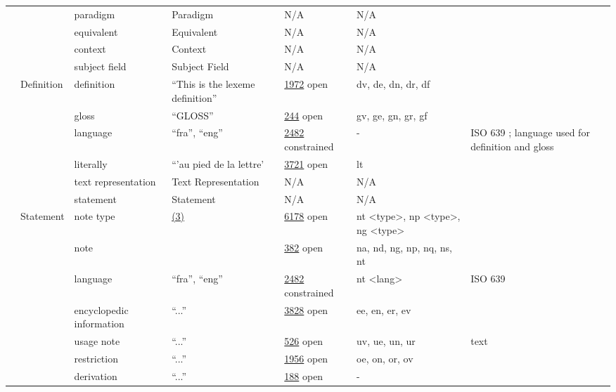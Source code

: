 \documentclass[a4paper,12pt]{article}
\begin{document}
\begin{center}
\begin{longtable}{*7{p{2cm}}}
& & paradigm & Paradigm & N/A & N/A & \\ \cmidrule{3-7}
& & equivalent & Equivalent & N/A & N/A & \\ \cmidrule{3-7}
& & context & Context & N/A & N/A & \\ \cmidrule{3-7}
& & subject field & Subject Field & N/A & N/A & \\ \cmidrule{2-7}
& \multirow{6}{2cm}{Definition} & definition & ``This is the lexeme definition'' & \href{http://www.isocat.org/datcat/DC-1972}{1972} open & dv, de, dn, dr, df & \\ \cmidrule{3-7}
& & gloss & ``\scshape{GLOSS}'' & \href{http://www.isocat.org/datcat/DC-244}{244} open & gv, ge, gn, gr, gf & \\ \cmidrule{3-7}
& & language & ``fra'', ``eng'' & \href{http://www.isocat.org/datcat/DC-2482}{2482} constrained & - & ISO 639 ; language used for definition and gloss \\ \cmidrule{3-7}
& & literally & ``'au pied de la lettre' & \href{http://www.isocat.org/datcat/DC-3721}{3721} open & lt & \\ \cmidrule{3-7}
& & text representation & Text Re\-pre\-sen\-ta\-tion & N/A & N/A & \\ \cmidrule{3-7}
& & statement & Statement & N/A & N/A & \\ \cmidrule{2-7}
& \multirow{8}{2cm}{Statement} & note type & \hyperlink{3}{(3)} \hypertarget{nt}{} & \href{http://www.isocat.org/datcat/DC-6178}{6178} open & nt \textless type\textgreater, np \textless type\textgreater, ng \textless type\textgreater & \\ \cmidrule{3-7}
& & note & & \href{http://www.isocat.org/datcat/DC-382}{382} open & na, nd, ng, np, nq, ns, nt & \\ \cmidrule{3-7}
& & language & ``fra'', ``eng'' & \href{http://www.isocat.org/datcat/DC-2482}{2482} constrained & nt \textless lang\textgreater & ISO 639 \\ \cmidrule{3-7}
& & encyclopedic information & ``...'' & \href{http://www.isocat.org/datcat/DC-3828}{3828} open & ee, en, er, ev & \\ \cmidrule{3-7}
& & usage note & ``...'' & \href{http://www.isocat.org/datcat/DC-526}{526} open & uv, ue, un, ur & text \\ \cmidrule{3-7}
& & restriction & ``...'' & \href{http://www.isocat.org/datcat/DC-1956}{1956} open & oe, on, or, ov & \\ \cmidrule{3-7}
& & derivation & ``...'' & \href{http://www.isocat.org/datcat/DC-188}{188} open & - & \\ \cmidrule{3-7}

\end{longtable}
\end{center}
\end{document}
